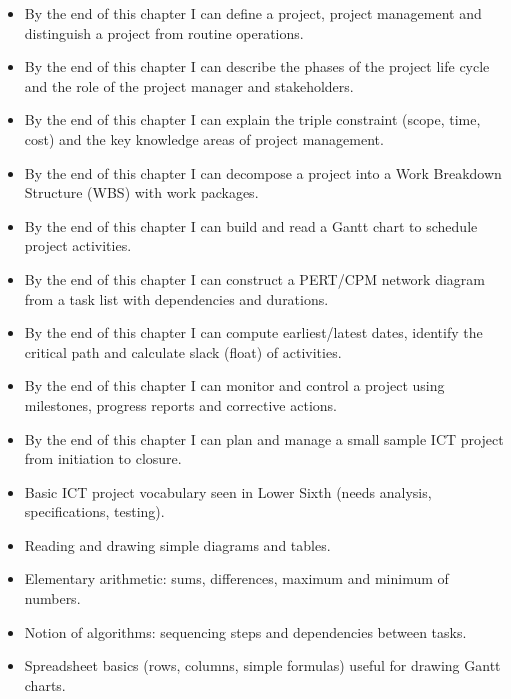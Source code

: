 \documentclass[11pt]{article}
\begin{document}
\begin{objectifs}
\begin{itemize}
\item By the end of this chapter I can define a project, project management and distinguish a project from routine operations.
\item By the end of this chapter I can describe the phases of the project life cycle and the role of the project manager and stakeholders.
\item By the end of this chapter I can explain the triple constraint (scope, time, cost) and the key knowledge areas of project management.
\item By the end of this chapter I can decompose a project into a Work Breakdown Structure (WBS) with work packages.
\item By the end of this chapter I can build and read a Gantt chart to schedule project activities.
\item By the end of this chapter I can construct a PERT/CPM network diagram from a task list with dependencies and durations.
\item By the end of this chapter I can compute earliest/latest dates, identify the critical path and calculate slack (float) of activities.
\item By the end of this chapter I can monitor and control a project using milestones, progress reports and corrective actions.
\item By the end of this chapter I can plan and manage a small sample ICT project from initiation to closure.
\end{itemize}
\end{objectifs}

\begin{prerequis}
\begin{itemize}
\item Basic ICT project vocabulary seen in Lower Sixth (needs analysis, specifications, testing).
\item Reading and drawing simple diagrams and tables.
\item Elementary arithmetic: sums, differences, maximum and minimum of numbers.
\item Notion of algorithms: sequencing steps and dependencies between tasks.
\item Spreadsheet basics (rows, columns, simple formulas) useful for drawing Gantt charts.
\end{itemize}
\end{prerequis}
\end{document}
